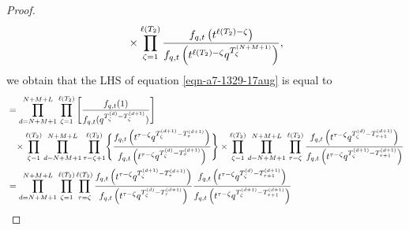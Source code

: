 \documentclass[12pt,reqno,a4paper]{amsart}
\numberwithin{equation}{section}
\theoremstyle{definition}
\begin{document}
\begin{proof}
\begin{align}
{	}
	\times 
	\prod_{\zeta = 1}^{\ell(T_2)}
	\frac{
		f_{q,t}\left(		
		t^{\ell(T_2) - \zeta} 				\right)
	}{
		f_{q,t}\left(		
		t^{\ell(T_2) - \zeta} q^{ T^{(N+M+1)}_{\zeta} 		}					\right)
	},
	\notag 
\end{align}
\normalsize
we obtain that the LHS of equation \eqref{eqn-a7-1329-17aug} is equal to 
\footnotesize
\begin{align}
	&= 
	\prod_{d = N+M+1}^{N+M+L}
	\prod_{\zeta = 1}^{\ell(T_2)}
	\left[
	\frac{
		f_{q,t}(1)
	}{
		f_{q,t}(q^{T^{(d)}_{\zeta} - T^{(d+1)}_{\zeta}})
	}
	\right]
	\\
	&\hspace{0.3cm}\times 
	\prod_{\zeta = 1}^{\ell(T_2)}
	\prod_{d = N+M+1}^{N+M+L}
	\prod_{\tau = \zeta + 1}^{\ell(T_2)}
	\Biggl\{
	\frac{
		f_{q,t}\left(	t^{\tau - \zeta} q^{ T^{(d+1)}_{\zeta} 	- T^{(d+1)}_{\tau}	 		}						\right)
	}{
		f_{q,t}\left(	t^{\tau - \zeta} q^{ T^{(d)}_{\zeta} 	- T^{(d+1)}_{\tau}		}						\right)
	}
	\Biggr\} 
	\times
	\prod_{\zeta = 1}^{\ell(T_2)}
	\prod_{d = N+M+1}^{N+M+L}
	\prod_{\tau = \zeta}^{\ell(T_2)}
	\frac{
		f_{q,t}\left(		
		t^{\tau - \zeta} q^{ T^{(d)}_{\zeta} 	- T^{(d+1)}_{\tau + 1} 		}					\right)
	}{
		f_{q,t}\left(		
		t^{\tau- \zeta} q^{ T^{(d+1)}_{\zeta} 	- T^{(d+1)}_{\tau + 1}			}					\right)
	}
	\notag 
	\\
	&= 
	\prod_{d = N+M+1}^{N+M+L}
	\prod_{\zeta = 1}^{\ell(T_2)}
	\prod_{\tau = \zeta}^{\ell(T_2)}
	\frac{
		f_{q,t}\left(	t^{\tau - \zeta} q^{ T^{(d+1)}_{\zeta} 	- T^{(d+1)}_{\tau}	 		}						\right)
	}{
		f_{q,t}\left(	t^{\tau - \zeta} q^{ T^{(d)}_{\zeta} 	- T^{(d+1)}_{\tau}		}						\right)
	}
	\frac{
		f_{q,t}\left(		
		t^{\tau - \zeta} q^{ T^{(d)}_{\zeta} 	- T^{(d+1)}_{\tau + 1} 		}					\right)
	}{
		f_{q,t}\left(		
		t^{\tau- \zeta} q^{ T^{(d+1)}_{\zeta} 	- T^{(d+1)}_{\tau + 1}			}					\right)
	}
	\notag 
\end{align}
\normalsize


\end{proof}
\end{document}
